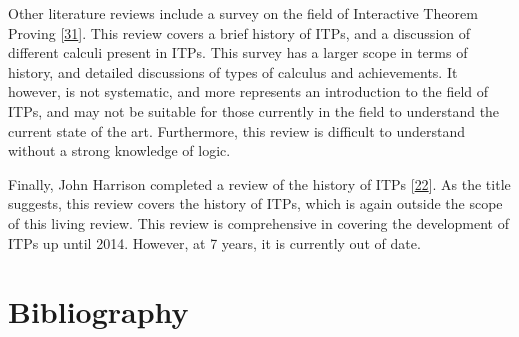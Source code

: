 \documentclass[
]{article}
\begin{document}
Other literature reviews include a survey on the field of Interactive
Theorem Proving {[}\protect\hyperlink{ref-a_survey_of_itp}{31}{]}. This
review covers a brief history of ITPs, and a discussion of different
calculi present in ITPs. This survey has a larger scope in terms of
history, and detailed discussions of types of calculus and achievements.
It however, is not systematic, and more represents an introduction to
the field of ITPs, and may not be suitable for those currently in the
field to understand the current state of the art. Furthermore, this
review is difficult to understand without a strong knowledge of logic.

Finally, John Harrison completed a review of the history of ITPs
{[}\protect\hyperlink{ref-history_of_itps}{22}{]}. As the title
suggests, this review covers the history of ITPs, which is again outside
the scope of this living review. This review is comprehensive in
covering the development of ITPs up until 2014. However, at 7 years, it
is currently out of date.

\hypertarget{bibliography}{%
\section*{Bibliography}\label{bibliography}}
\end{document}
